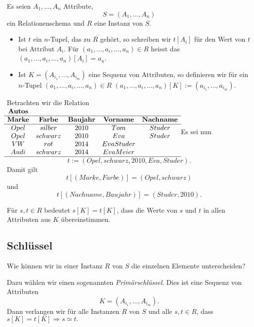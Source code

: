 \documentclass[../DatenbankenFS23.tex]{subfiles}
\begin{document}
\begin{defn}
    Es seien $A_1, \dots , A_n$ Attribute,
    \[S = (A_1, \dots , A_n)\]
    ein Relationenschema und $R$ eine Instanz von $S$.
    
    \begin{itemize}
        \item 
         Ist $t$ ein $n$-Tupel, das zu $R$ gehört, so schreiben wir $t[A_i]$ für den Wert
        von $t$ bei Attribut $A_i$. Für $(a_1, \dots , a_i, \dots , a_n) \in R$ heisst das
        $(a_1, \dots , a_i , \dots , a_n)[A_i] = a_u$.    
        \item Ist $K = (A_{i_1}, \dots , A_{i_m})$ eine Sequenz von Attributen, so definieren wir
        für ein $n$-Tupel $(a_1, \dots , a_i, \dots , a_n) \in R  $
        $(a_1, \dots , a_i, \dots , a_n)[K] := (a_{i_1}, \dots , a_{i_m})$.
    \end{itemize}
\end{defn}

\begin{beispiel}
    Betrachten wir die Relation\newline
        $\begin{matrix}
            \textbf{Autos}\\
            \hline
            \textbf{Marke} & \textbf{Farbe} & \textbf{Baujahr} & \textbf{Vorname} & \textbf{Nachname}\\
            \hline
            Opel & silber & 2010 & Tom & Studer\\
            Opel & schwarz & 2010 & Eva & Studer\\
            VW & rot & 2014 & Eva Studer\\
            Audi & schwarz & 2014 & Eva Meier\\
            \hline
        \end{matrix}$
            \newline\newline
    Es sei nun
\[t := (Opel, schwarz, 2010, Eva, Studer) .\]
Damit gilt
\[t[(Marke, Farbe)] = (Opel, schwarz)\]
und
\[t[(Nachname, Baujahr)] = (Studer, 2010) .\]
\end{beispiel}

\begin{bemerkung}
    Für $s, t \in R$ bedeutet $s[K] = t[K]$, dass die Werte von $s$ und $t$ in allen
    Attributen aus $K$ übereinstimmen.
\end{bemerkung}

\subsection{Schlüssel}
\begin{problem}
    Wie können wir in einer Instanz $R$ von $S$ die einzelnen Elemente unterscheiden?
\end{problem}
Dazu wählen wir einen sogenannten \emph{Primärschlüssel}. Dies ist eine Sequenz
von Attributen
\[K = (A_{i_1}, \dots , A_{i_m}) .\]
Dann verlangen wir für alle Instanzen $R$ von $S$ und alle $s, t \in R$, dass
$s[K] = t[K] \Rightarrow s \simeq t .$
\end{document}
